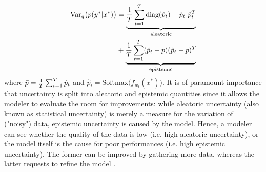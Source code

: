 \begin{equation}
    \begin{aligned}
    \text{Var}_q\big( p(y^*|x^*) \big) &= \underbrace{\frac{1}{T} \sum_{t=1}^T \text{diag}(\hat{p}_t)-\hat{p}_t \ \hat{p}_t^T}_\text{aleatoric} \\ &+ \underbrace{\frac{1}{T}\sum_{t=1}^T (\hat{p}_t - \Bar{p}) (\hat{p}_t - \Bar{p})^T}_\text{epistemic}
    \end{aligned}
\end{equation}
where $\Bar{p} = \frac{1}{T}\sum_{t=1}^T \hat{p}_t$ and $\hat{p}_t = \text{Softmax}\big ( f_{w_{t}}(x^*) \big )$.
\newline It is of paramount importance that uncertainty is split into aleatoric and epistemic quantities since it allows the modeler to evaluate the room for improvements: while aleatoric uncertainty (also known as statistical uncertainty) is merely a measure for the variation of ("noisy") data, epistemic uncertainty is caused by the model. Hence, a modeler can see whether the quality of the data is low (i.e. high aleatoric uncertainty), or the model itself is the cause for poor performances (i.e. high epistemic uncertainty). The former can be improved by gathering more data, whereas the latter requests to refine the model \cite{der2009aleatory}.
